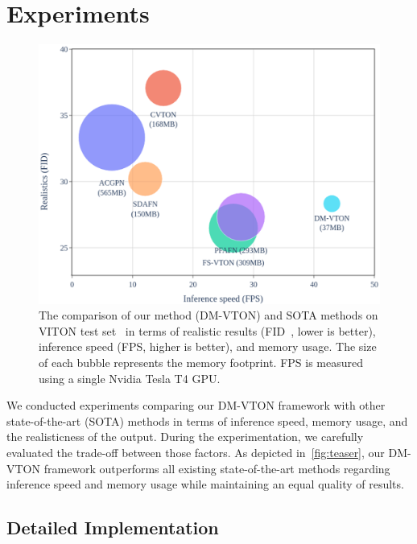\section{Experiments}
\begin{figure}[h!]
  \centering
  \includegraphics[width=\linewidth]{content/resources/images/tryon/teaser.png}
  \caption{The comparison of our method (DM-VTON) and SOTA methods on VITON test set~\cite{Han-CVPR2018-Viton} in terms of realistic results (FID~\cite{Heusel-NeurIPS2017-FID}, lower is better), inference speed (FPS, higher is better), and memory usage. The size of each bubble represents the memory footprint. FPS is measured using a single Nvidia Tesla T4 GPU.}
  \label{fig:teaser}
  \vspace{-1mm}
\end{figure}

We conducted experiments comparing our DM-VTON framework with other state-of-the-art (SOTA) methods in terms of inference speed, memory usage, and the realisticness of the output. During the experimentation, we carefully evaluated the trade-off between those factors. As depicted in~\autoref{fig:teaser}, our DM-VTON framework outperforms all existing state-of-the-art methods regarding inference speed and memory usage while maintaining an equal quality of results.

\subsection{Detailed Implementation}

